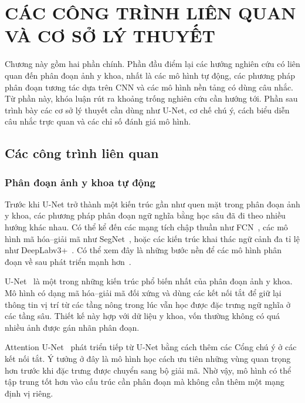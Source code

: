 \chapter{CÁC CÔNG TRÌNH LIÊN QUAN VÀ CƠ SỞ LÝ THUYẾT}
\label{Chapter2}

Chương này gồm hai phần chính. Phần đầu điểm lại các hướng nghiên cứu có liên quan đến phân đoạn ảnh y khoa, nhất là các mô hình tự động, các phương pháp phân đoạn tương tác dựa trên CNN và các mô hình nền tảng có dùng câu nhắc. Từ phần này, khóa luận rút ra khoảng trống nghiên cứu cần hướng tới. Phần sau trình bày các cơ sở lý thuyết cần dùng như U-Net, cơ chế chú ý, cách biểu diễn câu nhắc trực quan và các chỉ số đánh giá mô hình.

\section{Các công trình liên quan}
\label{sec:related_work}

\subsection{Phân đoạn ảnh y khoa tự động}

Trước khi U-Net trở thành một kiến trúc gần như quen mặt trong phân đoạn ảnh y khoa, các phương pháp phân đoạn ngữ nghĩa bằng học sâu đã đi theo nhiều hướng khác nhau. Có thể kể đến các mạng tích chập thuần như FCN~\cite{long2015fcn}, các mô hình mã hóa--giải mã như SegNet~\cite{badrinarayanan2017segnet}, hoặc các kiến trúc khai thác ngữ cảnh đa tỉ lệ như DeepLabv3+~\cite{chen2018deeplabv3plus}. Có thể xem đây là những bước nền để các mô hình phân đoạn về sau phát triển mạnh hơn~\cite{minaee2021survey}.

U-Net~\cite{ronneberger2015unet} là một trong những kiến trúc phổ biến nhất của phân đoạn ảnh y khoa. Mô hình có dạng mã hóa--giải mã đối xứng và dùng các kết nối tắt để giữ lại thông tin vị trí từ các tầng nông trong lúc vẫn học được đặc trưng ngữ nghĩa ở các tầng sâu. Thiết kế này hợp với dữ liệu y khoa, vốn thường không có quá nhiều ảnh được gán nhãn phân đoạn.

Attention U-Net~\cite{oktay2018attentionunet} phát triển tiếp từ U-Net bằng cách thêm các Cổng chú ý ở các kết nối tắt. Ý tưởng ở đây là mô hình học cách ưu tiên những vùng quan trọng hơn trước khi đặc trưng được chuyển sang bộ giải mã. Nhờ vậy, mô hình có thể tập trung tốt hơn vào cấu trúc cần phân đoạn mà không cần thêm một mạng định vị riêng.

